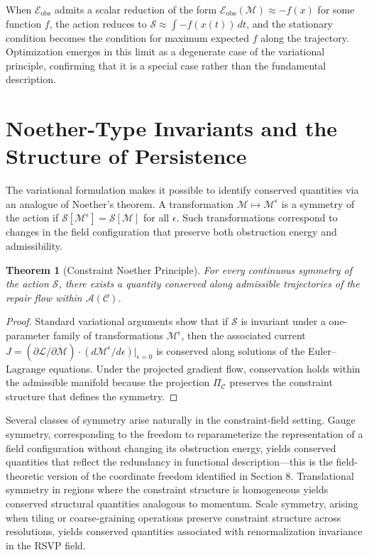 \documentclass[12pt, a4paper, oneside]{article}
\theoremstyle{plain}
\newtheorem{theorem}{Theorem}[section]
\theoremstyle{definition}
\theoremstyle{remark}
\newcommand{\C}{\mathcal{C}}
\newcommand{\A}{\mathcal{A}}
\begin{document}
When $\mathcal{E}_{\mathrm{obs}}$ admits a scalar reduction of the form $\mathcal{E}_{\mathrm{obs}}(\mathcal{M}) \approx -f(x)$ for some function $f$, the action reduces to $\mathcal{S} \approx \int -f(x(t))\, dt$, and the stationary condition becomes the condition for maximum expected $f$ along the trajectory. Optimization emerges in this limit as a degenerate case of the variational principle, confirming that it is a special case rather than the fundamental description.

\section{Noether-Type Invariants and the Structure of Persistence}

The variational formulation makes it possible to identify conserved quantities via an analogue of Noether's theorem. A transformation $\mathcal{M} \mapsto \mathcal{M}^\epsilon$ is a symmetry of the action if $\mathcal{S}[\mathcal{M}^\epsilon] = \mathcal{S}[\mathcal{M}]$ for all $\epsilon$. Such transformations correspond to changes in the field configuration that preserve both obstruction energy and admissibility.

\begin{theorem}[Constraint Noether Principle]
\label{thm:noether}
For every continuous symmetry of the action $\mathcal{S}$, there exists a quantity conserved along admissible trajectories of the repair flow within $\A(\C)$.
\end{theorem}

\begin{proof}
Standard variational arguments show that if $\mathcal{S}$ is invariant under a one-parameter family of transformations $\mathcal{M}^\epsilon$, then the associated current $J = (\partial \mathcal{L} / \partial \dot{\mathcal{M}}) \cdot (d\mathcal{M}^\epsilon / d\epsilon)|_{\epsilon=0}$ is conserved along solutions of the Euler--Lagrange equations. Under the projected gradient flow, conservation holds within the admissible manifold because the projection $\Pi_\C$ preserves the constraint structure that defines the symmetry.
\end{proof}

Several classes of symmetry arise naturally in the constraint-field setting. Gauge symmetry, corresponding to the freedom to reparameterize the representation of a field configuration without changing its obstruction energy, yields conserved quantities that reflect the redundancy in functional description---this is the field-theoretic version of the coordinate freedom identified in Section 8. Translational symmetry in regions where the constraint structure is homogeneous yields conserved structural quantities analogous to momentum. Scale symmetry, arising when tiling or coarse-graining operations preserve constraint structure across resolutions, yields conserved quantities associated with renormalization invariance in the RSVP field.
\end{document}
